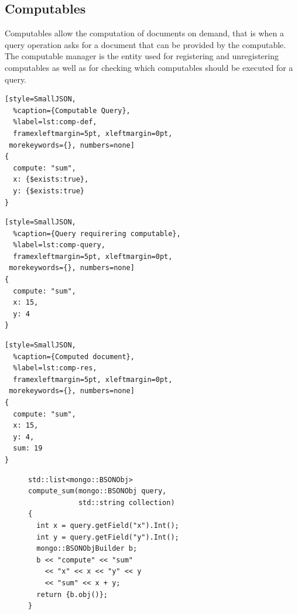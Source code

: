 \subsection{Computables}
\label{sec:impl-computables}
Computables allow the computation of documents on demand, that is when
a query operation asks for a document that can be provided by the
computable. The computable manager is the entity used for registering
and unregistering computables as well as for checking which
computables should be executed for a query.\\
\begin{listing}
\addtocounter{lstlisting}{1}
\noindent
\begin{minipage}[b]{.30\textwidth}
\begin{lstlisting}[style=SmallJSON,
  %caption={Computable Query},
  %label=lst:comp-def,
  framexleftmargin=5pt, xleftmargin=0pt,
 morekeywords={}, numbers=none]
{
  compute: "sum",
  x: {$exists:true},
  y: {$exists:true}
}
\end{lstlisting}
\end{minipage}%
\hfill
\begin{minipage}[b]{.25\textwidth}
\begin{lstlisting}[style=SmallJSON,
  %caption={Query requirering computable},
  %label=lst:comp-query,
  framexleftmargin=5pt, xleftmargin=0pt,
 morekeywords={}, numbers=none]
{
  compute: "sum",
  x: 15,
  y: 4
}
\end{lstlisting}
\end{minipage}%
\hfill
\begin{minipage}[b]{.25\textwidth}
\begin{lstlisting}[style=SmallJSON,
  %caption={Computed document},
  %label=lst:comp-res,
  framexleftmargin=5pt, xleftmargin=0pt,
 morekeywords={}, numbers=none]
{
  compute: "sum",
  x: 15,
  y: 4,
  sum: 19
}
\end{lstlisting}
  \vspace{-0.3cm}
  \vspace{0.3cm}
\end{minipage}%
\caption{Queries and documents involved in a computable for addition}
\label{lst:comp}
\end{listing}
\begin{figure}
  \vspace{-0.8cm}
\begin{lstlisting}[style=SmallCpp,
  caption={Function of a computable},
  label=lst:comp-func,
  framexleftmargin=5pt, xleftmargin=0pt,
 morekeywords={}, numbers=none]
std::list<mongo::BSONObj>
compute_sum(mongo::BSONObj query,
            std::string collection)
{
  int x = query.getField("x").Int();
  int y = query.getField("y").Int();
  mongo::BSONObjBuilder b;
  b << "compute" << "sum"
    << "x" << x << "y" << y
    << "sum" << x + y;
  return {b.obj()};
}
\end{lstlisting}
\vspace{-8mm}
\end{figure}
